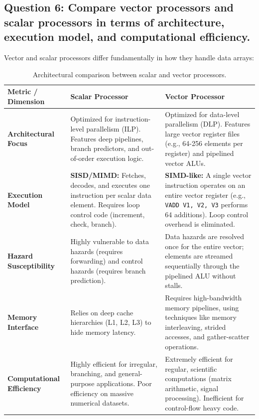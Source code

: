 \documentclass[11pt, a4paper]{article}
\begin{document}
\subsection*{Question 6: Compare vector processors and scalar processors in terms of architecture, execution model, and computational efficiency.}

Vector and scalar processors differ fundamentally in how they handle data arrays:

\begin{table}[htbp]
    \centering
    \begin{tabular}{lp{5.2cm}p{5.2cm}}
        \toprule
        Metric / Dimension & Scalar Processor & Vector Processor \\
        \midrule
        \textbf{Architectural Focus} & Optimized for instruction-level parallelism (ILP). Features deep pipelines, branch predictors, and out-of-order execution logic. & Optimized for data-level parallelism (DLP). Features large vector register files (e.g., 64-256 elements per register) and pipelined vector ALUs. \\
        \midrule
        \textbf{Execution Model} & \textbf{SISD/MIMD:} Fetches, decodes, and executes one instruction per scalar data element. Requires loop control code (increment, check, branch). & \textbf{SIMD-like:} A single vector instruction operates on an entire vector register (e.g., \texttt{VADD V1, V2, V3} performs 64 additions). Loop control overhead is eliminated. \\
        \midrule
        \textbf{Hazard Susceptibility} & Highly vulnerable to data hazards (requires forwarding) and control hazards (requires branch prediction). & Data hazards are resolved once for the entire vector; elements are streamed sequentially through the pipelined ALU without stalls. \\
        \midrule
        \textbf{Memory Interface} & Relies on deep cache hierarchies (L1, L2, L3) to hide memory latency. & Requires high-bandwidth memory pipelines, using techniques like memory interleaving, strided accesses, and gather-scatter operations. \\
        \midrule
        \textbf{Computational Efficiency} & Highly efficient for irregular, branching, and general-purpose applications. Poor efficiency on massive numerical datasets. & Extremely efficient for regular, scientific computations (matrix arithmetic, signal processing). Inefficient for control-flow heavy code. \\
        \bottomrule
    \end{tabular}
    \caption{Architectural comparison between scalar and vector processors.}
\end{table}
\end{document}
